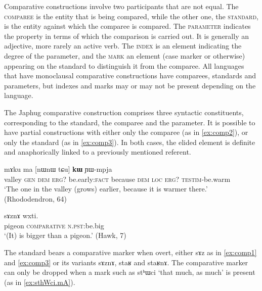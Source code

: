 \documentclass[oldfontcommands,oneside,a4paper,11pt]{article}
\newcommand{\ipa}[1]{{\phon #1}} %
\begin{document}
Comparative constructions involve two participants that are not equal. The \textsc{comparee} is  the entity that is being compared, while the other one, the \textsc{standard}, is the entity against which the comparee is compared. The \textsc{parameter} indicates the property in terms of which the comparison is carried out. It is generally an adjective, more rarely an active verb. The \textsc{index} is an element indicating the degree of the parameter, and the \textsc{mark} an element (case marker or otherwise) appearing on the standard to distinguish it from the comparee. All languages that have monoclausal comparative constructions have comparees, standards and parameters, but indexes and marks may or may not be present depending on the language.

 

The Japhug comparative construction comprises three syntactic constituents, corresponding to the standard, the comparee and the parameter. It is possible to have partial constructions with either only the comparee  (as in \ref{ex:comp2}), or only the standard (as in \ref{ex:comp3}). In both cases, the elided element is definite and anaphorically linked to a previously mentioned referent.

 \begin{exe}
\ex \label{ex:comp2}
\gll 
[\ipa{co}  	\ipa{ɣɯ}  	\ipa{nɯnɯ}]  	\ipa{\textbf{kɯ}}  	\ipa{mɤku}  	\ipa{ma}  	[\ipa{nɯnɯ} \ipa{tɕu}]  	\ipa{\textbf{kɯ}}  	\ipa{ɲɯ-mpja}  \\
valley \textsc{gen} \textsc{dem} \textsc{erg?} be.early:\textsc{fact} because \textsc{dem} \textsc{loc} \textsc{erg?} \textsc{testim}-be.warm \\
\glt `The one in the valley (grows) earlier, because it is warmer there.' (Rhododendron, 64)
\end{exe}

\begin{exe}
\ex \label{ex:comp3}
\gll  \ipa{qɤjdo}  	\ipa{sɤznɤ}  	\ipa{wxti.}     \\
pigeon \textsc{comparative} \textsc{n.pst:}be.big \\
\glt `(It) is bigger than a pigeon.' (Hawk, 7)
\end{exe}


The standard  bears a comparative marker when overt, either \ipa{sɤz} as in \ref{ex:comp1} and \ref{ex:comp3} or its variants \ipa{sɤznɤ}, \ipa{staʁ} and \ipa{staʁnɤ}. The comparative marker can only be dropped when a mark such as \ipa{stʰɯci} `that much, as much' is present (as in \ref{ex:sthWci.mA}).
 
\end{document}
